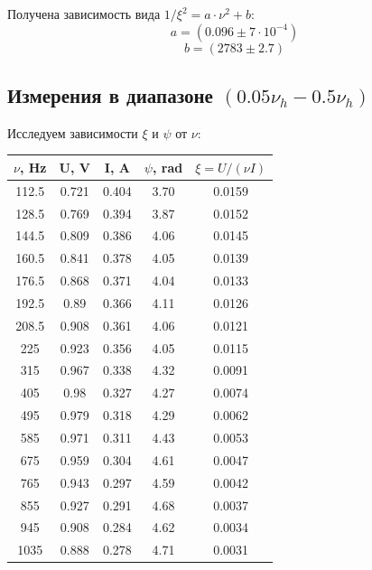 \documentclass{article}
\begin{document}
Получена зависимость вида \( 1/\xi^2 = a\cdot \nu^2 + b \):
\[ a = (0.096 \pm 7\cdot10^{-4}) \]
\[ b = (2783 \pm 2.7) \]
\subsection{Измерения в диапазоне \((0.05\nu_h - 0.5\nu_h)\)}
Исследуем зависимости \(\xi\) и \(\psi\) от \(\nu\):
\begin{table}[H]
    \centering
    \begin{tabular}{|c|c|c|c|c|}
    \hline
    \(\nu\), Hz & U, V  & I, A  & \(\psi\), rad & \(\xi = U/(\nu I)\) \\\hline
    112.5   & 0.721 & 0.404 & 3.70 & 0.0159\\\hline
    128.5   & 0.769 & 0.394 & 3.87 & 0.0152\\\hline
    144.5   & 0.809 & 0.386 & 4.06 & 0.0145\\\hline
    160.5   & 0.841 & 0.378 & 4.05 & 0.0139\\\hline
    176.5   & 0.868 & 0.371 & 4.04 & 0.0133\\\hline
    192.5   & 0.89  & 0.366 & 4.11 & 0.0126\\\hline
    208.5   & 0.908 & 0.361 & 4.06 & 0.0121\\\hline
    225     & 0.923 & 0.356 & 4.05 & 0.0115\\\hline
    315     & 0.967 & 0.338 & 4.32 & 0.0091\\\hline
    405     & 0.98  & 0.327 & 4.27 & 0.0074\\\hline
    495     & 0.979 & 0.318 & 4.29 & 0.0062\\\hline
    585     & 0.971 & 0.311 & 4.43 & 0.0053\\\hline
    675     & 0.959 & 0.304 & 4.61 & 0.0047\\\hline
    765     & 0.943 & 0.297 & 4.59 & 0.0042\\\hline
    855     & 0.927 & 0.291 & 4.68 & 0.0037\\\hline
    945     & 0.908 & 0.284 & 4.62 & 0.0034\\\hline
    1035    & 0.888 & 0.278 & 4.71 & 0.0031\\\hline
    \end{tabular}
\end{table}
\end{document}
